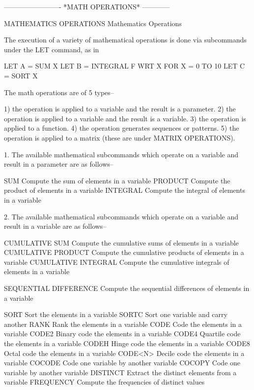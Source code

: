 -------------------------  *MATH OPERATIONS*  ------------
 
MATHEMATICS OPERATIONS
Mathematics Operations
 
The execution of a variety of mathematical operations is done via
subcommands under the LET command, as in
 
   LET A = SUM X
   LET B = INTEGRAL F WRT X FOR X = 0 TO 10
   LET C = SORT X
 
The math operations are of 5 types--
 
   1) the operation is applied to a variable and the result is a
      parameter.
   2) the operation is applied to a variable and the result is a
      variable.
   3) the operation is applied to a function.
   4) the operation generates sequences or patterns.
   5) the operation is applied to a matrix (these are under MATRIX
      OPERATIONS).
 
1. The available mathematical subcommands which operate on a variable
   and result in a parameter are as follows--
 
      SUM                    Compute the sum of elements in a variable
      PRODUCT                Compute the product of elements in a
                             variable
      INTEGRAL               Compute the integral of elements in a
                             variable
 
2. The available mathematical subcommands which operate on a variable
   and result in a variable are as follows--
 
      CUMULATIVE SUM         Compute the cumulative sums of elements in
                             a variable
      CUMULATIVE PRODUCT     Compute the cumulative products of
                             elements in a variable
      CUMULATIVE INTEGRAL    Compute the cumulative integrals of
                             elements in a variable
 
      SEQUENTIAL DIFFERENCE  Compute the sequential differences of
                             elements in a variable
 
      SORT                   Sort the elements in a variable
      SORTC                  Sort one variable and carry another
      RANK                   Rank the elements in a variable
      CODE                   Code the elements in a variable
      CODE2                  Binary code the elements in a variable
      CODE4                  Quartile code the elements in a variable
      CODEH                  Hinge code the elements in a variable
      CODE8                  Octal code the elements in a variable
      CODE<N>                Decile code the elements in a variable
      COCODE                 Code one variable by another variable
      COCOPY                 Code one variable by another variable
      DISTINCT               Extract the distinct elements from a
                             variable
      FREQUENCY              Compute the frequencies of distinct values
 
